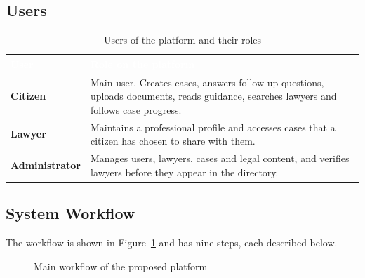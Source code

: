\documentclass[12pt,a4paper]{report}
\newcommand{\thd}[1]{\textcolor{white}{\textbf{#1}}}
\newcommand{\headrow}{\rowcolor{tablehead}}
\begin{document}
\subsection{Users}
\begin{table}[H]
\centering
\caption{Users of the platform and their roles}
\label{tab:users}
\begin{tabular}{|L{3.6cm}|L{10.4cm}|}
\hline
\headrow \thd{User} & \thd{Role on the platform} \\ \hline
\textbf{Citizen} & Main user. Creates cases, answers follow-up questions, uploads documents, reads guidance, searches lawyers and follows case progress. \\ \hline
{}\textbf{Lawyer} & Maintains a professional profile and accesses cases that a citizen has chosen to share with them. \\ \hline
\textbf{Administrator} & Manages users, lawyers, cases and legal content, and verifies lawyers before they appear in the directory. \\ \hline
\end{tabular}
\end{table}

\subsection{System Workflow}
The workflow is shown in Figure~\ref{fig:workflow} and has nine steps, each described below.

\begin{figure}[H]
\centering
{}
\caption{Main workflow of the proposed platform}
\label{fig:workflow}
\end{figure}
\end{document}
